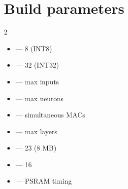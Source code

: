 \section{Build parameters}
\begin{multicols}{2}\footnotesize
\begin{itemize}
\item {} --- 8 (INT8)
\item {} --- 32 (INT32)
\item {} --- max inputs
\item {} --- max neurons
\item {} --- simultaneous MACs
\columnbreak
\item {} --- max layers
\item {} --- 23 (8 MB)
\item {} --- 16
\item {} --- PSRAM timing
\end{itemize}
\end{multicols}
